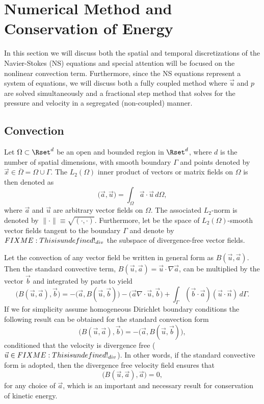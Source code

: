 \section{Numerical Method and Conservation of Energy}
\label{sec:Numerical}

In this section we will discuss both the spatial and temporal
discretizations of the Navier-Stokes (NS) equations and special
attention will be focused on the nonlinear convection
term. Furthermore, since the NS equations represent a system of
equations, we will discuss both a fully coupled method where $\vec{u}$
and $p$ are solved simultaneously and a fractional step method that
solves for the pressure and velocity in a segregated (non-coupled)
manner.

\subsection{Convection}
\label{sec:Convection}
Let $\Omega \subset \Rset^d$ be an open and bounded region in
$\Rset^d$, where $d$ is the number of spatial dimensions, with smooth
boundary $\Gamma$ and points denoted by
$\vec{x}\in \overline{\Omega}=\Omega \cup \Gamma$. The $L_2(\Omega)$
inner product of vectors or matrix fields on $\Omega$ is then denoted
as
\begin{equation}
 \bigl( \vec{a},\vec{u} \bigr) = \int_{\Omega} \vec{a}\cdot \vec{u}\, d\Omega,
 \label{eq:L2}
\end{equation}
where $\vec{a}$ and $\vec{u}$ are arbitrary vector fields on
$\Omega$. The associated $L_2$-norm is denoted by
$\| \cdot \| \equiv \sqrt{\left( \cdot, \cdot \right)}$. Furthermore,
let \Hset be the space of $L_2(\Omega)$-smooth vector fields tangent
to the boundary $\Gamma$ and denote by $FIXME: This is undefined!_{div}$ the subspace of
divergence-free vector fields.

Let the convection of any vector field be written in general form as
$B(\vec{u},\vec{a})$. Then the standard convective term,
$B(\vec{u},\vec{a}) = \vec{u}\cdot \nabla \vec{a} $, can be multiplied
by the vector $\vec{b}$ and integrated by parts to yield
\begin{equation}
 \bigl( B(\vec{u}, \vec{a}), \vec{b}\bigr) = -\bigl( \vec{a}, B(\vec{u},\vec{b})\bigr) - \bigl( \vec{a} \nabla \cdot \vec{u} , \vec{b} \bigr) + \int_{\Gamma} \left(\vec{b} \cdot \vec{a} \right)\left(\vec{u} \cdot \vec{n} \right) \, d\Gamma.
\label{eq:Bu1}
\end{equation}
If we for simplicity assume homogeneous Dirichlet boundary conditions
the following result can be obtained for the standard convection form
\begin{equation}
\bigl( B(\vec{u},\vec{a}), \vec{b} \bigr) = -\bigl( \vec{a}, B(\vec{u},\vec{b}) \bigr),
\label{eq:Bu2}
\end{equation}
conditioned that the velocity is divergence free
($\vec{u}\in FIXME: This is undefined!_{div}$). In other words, if the standard convective
form is adopted, then the divergence free velocity field ensures that
\begin{equation}
\bigl( B(\vec{u}, \vec{a}), \vec{a} \bigr) = 0,
\label{eq:B0}
\end{equation}
for any choice of $\vec{a}$, which is an important and necessary
result for conservation of kinetic energy.

